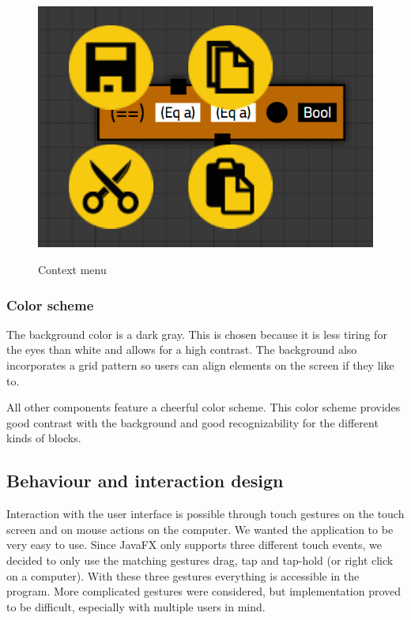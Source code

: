 \begin{figure}[p]
	\centering
	\includegraphics[scale=0.5]{Images/blocks-menu}
	\label{fig:blocks-menu}
	\caption{Context menu}
\end{figure}

\subsubsection{Color scheme}

The background color is a dark gray.
This is chosen because it is less tiring for the eyes than white and allows for a high contrast.
The background also incorporates a grid pattern so users can align elements on the screen if they like to.

All other components feature a cheerful color scheme.
This color scheme provides good contrast with the background and good recognizability for the different kinds of blocks.

\subsection{Behaviour and interaction design}

Interaction with the user interface is possible through touch gestures on the touch screen and on mouse actions on the computer.
We wanted the application to be very easy to use.
Since JavaFX only supports three different touch events, we decided to only use the matching gestures drag, tap and tap-hold (or right click on a computer).
With these three gestures everything is accessible in the program.
More complicated gestures were considered, but implementation proved to be difficult, especially with multiple users in mind.

